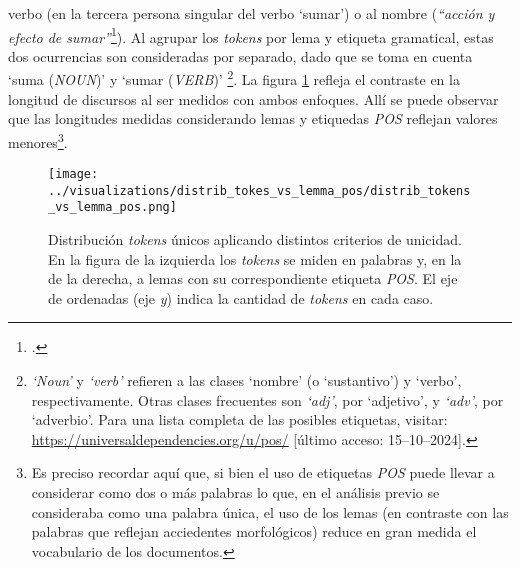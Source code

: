 verbo (en la tercera persona singular del verbo `sumar') o al nombre
(\textit{``acci\'on y efecto de sumar''}\footnote{.}). Al
agrupar los \textit{tokens} por lema y etiqueta gramatical, estas dos
ocurrencias son consideradas por separado, dado que se toma en cuenta
`suma (\textit{NOUN})' y `sumar (\textit{VERB})'
\footnote{\textit{`Noun'} y \textit{`verb'} refieren a las clases `nombre'
(o `sustantivo') y `verbo', respectivamente. Otras clases frecuentes son \textit{`adj'},
por `adjetivo', y \textit{`adv'}, por `adverbio'. Para una lista completa
de las posibles etiquetas, visitar: \url{https://universaldependencies.org/u/pos/}
[\'ultimo acceso: 15--10--2024].}. La figura \ref{fig-distrib-unique-tokens} refleja el contraste
en la longitud de discursos al ser medidos con ambos enfoques.
All\'i se puede observar que las longitudes medidas considerando lemas y etiquedas
\textit{POS} reflejan valores menores\footnote{Es preciso recordar aqu\'i
que, si bien el uso de etiquetas \textit{POS} puede llevar a considerar
como dos o m\'as palabras lo que, en el an\'alisis previo se consideraba
como una palabra \'unica, el uso de los lemas (en contraste con
las palabras que reflejan acciedentes morfol\'ogicos) reduce en gran
medida el vocabulario de los documentos.}.

\begin{figure}[h!]
\centering
\texttt{[image: ../visualizations/distrib\_tokes\_vs\_lemma\_pos/distrib\_tokens\_vs\_lemma\_pos.png]}
\caption{Distribuci\'on \textit{tokens} \'unicos aplicando distintos criterios de unicidad.
En la figura de la izquierda los \textit{tokens} se miden en palabras y, en la de la
derecha, a lemas con su correspondiente etiqueta \textit{POS}. El eje de ordenadas
(eje \textit{y}) indica la cantidad de \textit{tokens} en cada caso.}
\label{fig-distrib-unique-tokens}
\end{figure}